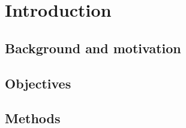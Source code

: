 \chapter[Introduction]{Introduction}

\section{Background and motivation}

\section{Objectives}

\section{Methods}